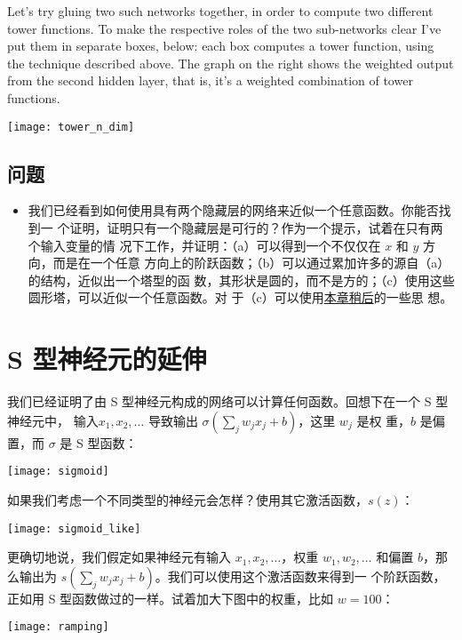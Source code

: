 Let's try gluing two such networks together, in order to compute two different
tower functions. To make the respective roles of the two sub-networks clear I've
put them in separate boxes, below: each box computes a tower function, using the
technique described above. The graph on the right shows the weighted output from
the second hidden layer, that is, it's a weighted combination of tower
functions.

\begin{center}
  \texttt{[image: tower\_n\_dim]}
\end{center}

\subsection*{问题}

\begin{itemize}
  \item 我们已经看到如何使用具有两个隐藏层的网络来近似一个任意函数。你能否找到一
    个证明，证明只有一个隐藏层是可行的？作为一个提示，试着在只有两个输入变量的情
    况下工作，并证明：（a）可以得到一个不仅仅在 $x$ 和 $y$ 方向，而是在一个任意
    方向上的阶跃函数；（b）可以通过累加许多的源自（a）的结构，近似出一个塔型的函
    数，其形状是圆的，而不是方的；（c）使用这些圆形塔，可以近似一个任意函数。对
    于（c）可以使用\hyperref[sec:fixing_up_the_step_functions]{本章稍后}的一些思
    想。
\end{itemize}

\section{S 型神经元的延伸}
\label{sec:extension_beyond_sigmoid_neurons}

我们已经证明了由 S 型神经元构成的网络可以计算任何函数。回想下在一个 S 型神经元中，
输入$x_1, x_2, \ldots$ 导致输出 $\sigma(\sum_j w_j x_j + b)$，这里 $w_j$ 是权
重，$b$ 是偏置，而 $\sigma$ 是 S 型函数：
\begin{center}
  \texttt{[image: sigmoid]}
\end{center} 

如果我们考虑一个不同类型的神经元会怎样？使用其它激活函数，$s(z)$：
\begin{center}
  \texttt{[image: sigmoid\_like]}
\end{center} 

更确切地说，我们假定如果神经元有输入 $x_1, x_2, \ldots$，权重 $w_1, w_2, \ldots$
和偏置 $b$，那么输出为 $s(\sum_j w_j x_j + b)$。我们可以使用这个激活函数来得到一
个阶跃函数，正如用 S 型函数做过的一样。试着加大下图中的权重，比如 $w = 100$：
\begin{center}
  \texttt{[image: ramping]}
\end{center}

